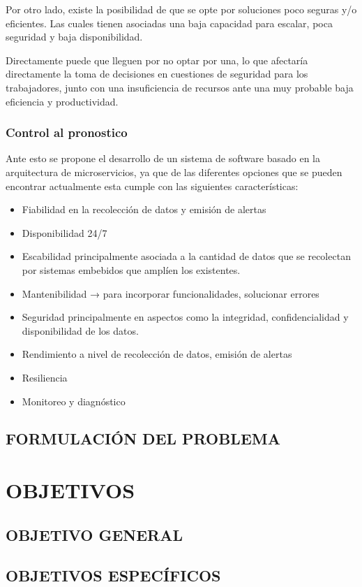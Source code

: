 \documentclass[stu,12pt,floatsintext]{apa7}
\begin{document}
	Por otro lado, existe la posibilidad de que se opte por soluciones poco seguras y/o eficientes. Las cuales tienen asociadas una baja capacidad para escalar, poca seguridad y baja disponibilidad.
	
	Directamente puede que lleguen por no optar por una, lo que afectaría directamente la toma de decisiones en cuestiones de seguridad para los trabajadores, junto con una  insuficiencia de recursos ante una muy probable baja eficiencia y productividad.
	\subsubsection{Control al pronostico}
	Ante esto se propone el desarrollo de un sistema de software basado en la arquitectura de microservicios, ya que de las diferentes opciones que se pueden encontrar actualmente esta cumple con las siguientes características:
	
	\begin{itemize}
		\item Fiabilidad en la recolección de datos y emisión de alertas
		\item Disponibilidad 24/7
		\item Escabilidad principalmente asociada a la cantidad de datos que se recolectan por sistemas embebidos que amplíen los existentes.
		\item Mantenibilidad → para incorporar funcionalidades, solucionar errores
		\item Seguridad principalmente en aspectos como la integridad, confidencialidad y disponibilidad de los datos.
		\item Rendimiento a nivel de recolección de datos, emisión de alertas
		\item Resiliencia 
		\item Monitoreo y diagnóstico
	\end{itemize}
	\subsection{FORMULACIÓN DEL PROBLEMA}
	
	
	\section{OBJETIVOS}
	\subsection{OBJETIVO GENERAL}
	\subsection{OBJETIVOS ESPECÍFICOS}
	
\end{document}
